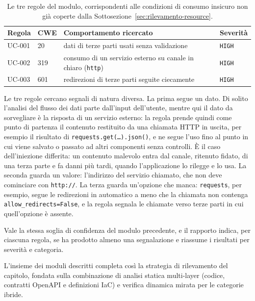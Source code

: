 \begin{table}[htbp]
  \centering
  \small
  \linespread{1.0}\selectfont
  \renewcommand{\arraystretch}{1.15}
  \begin{tabularx}{\linewidth}{@{}l l X l@{}}
    \toprule
    \textbf{Regola} & \textbf{CWE} & \textbf{Comportamento ricercato} & \textbf{Severità} \\
    \midrule
    UC-001 & 20~\cite{cwe20} & dati di terze parti usati senza validazione & \texttt{HIGH} \\
    UC-002 & 319~\cite{cwe319} & consumo di un servizio esterno su canale in chiaro (\texttt{http}) & \texttt{HIGH} \\
    UC-003 & 601~\cite{cwe601} & redirezioni di terze parti seguite ciecamente & \texttt{HIGH} \\
    \bottomrule
  \end{tabularx}
  \caption[Regole del modulo Unsafe Consumption of APIs]{Le tre regole del modulo,
    corrispondenti alle condizioni di consumo insicuro non già coperte dalla
  Sottosezione~\ref{sec:rilevamento-resource}.}
  \label{tab:regole-unsafe}
\end{table}

Le tre regole cercano segnali di natura diversa. La prima segue un dato. Di
solito l'analisi del flusso dei dati parte dall'input dell'utente, mentre qui
il dato da sorvegliare è la risposta di un servizio esterno: la regola prende
quindi come punto di partenza il contenuto restituito da una chiamata HTTP in
uscita, per esempio il risultato di \texttt{requests.get(\dots).json()}, e ne
segue l'uso fino al punto in cui viene salvato o passato ad altri componenti
senza controlli. È il caso dell'iniezione differita: un contenuto malevolo
entra dal canale, ritenuto fidato, di una terza parte e fa danni più tardi,
quando l'applicazione lo rilegge e lo usa. La seconda guarda un valore: l'indirizzo del servizio
chiamato, che non deve cominciare con \texttt{http://}. La terza guarda
un'opzione che manca: \texttt{requests}, per esempio, segue le redirezioni in
automatico a meno che la chiamata non contenga \texttt{allow\_redirects=False},
e la regola segnala le chiamate verso terze parti in cui quell'opzione è
assente.

Vale la stessa soglia di confidenza del modulo precedente, e il rapporto indica, per ciascuna regola, se ha prodotto almeno una segnalazione e
riassume i risultati per severità e categoria.

L'insieme dei moduli descritti completa così la strategia di rilevamento del capitolo, fondata sulla combinazione di analisi statica multi-layer (codice, contratti OpenAPI e definizioni IaC) e verifica dinamica mirata per le categorie ibride.

